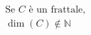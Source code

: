 \documentclass[preview]{standalone}
\begin{document}
\begin{align*}
\text{Se } C \text{ è un frattale, } \\ \operatorname{dim}(C) \not \in \mathbb{N}
\end{align*}
\end{document}
